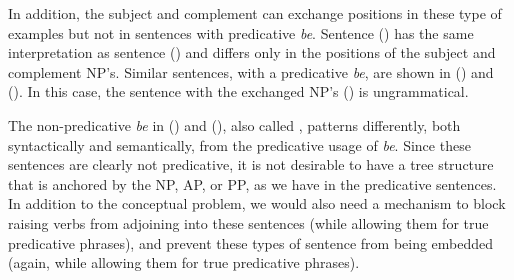


In addition, the subject and complement can exchange positions in these type of
examples but not in sentences with predicative {\it be}.  Sentence ({})
has the same interpretation as sentence ({}) and differs only in the
positions of the subject and complement NP's. Similar sentences, with a
predicative {\it be}, are shown in ({}) and ({}).  In this case,
the sentence with the exchanged NP's ({}) is ungrammatical.


The non-predicative {\it be} in ({}) and ({}), also called
, patterns differently, both syntactically and
semantically, from the predicative usage of {\it be}.  Since these sentences
are clearly not predicative, it is not desirable to have a tree structure that
is anchored by the NP, AP, or PP, as we have in the predicative sentences.  In
addition to the conceptual problem, we would also need a mechanism to block
raising verbs from adjoining into these sentences (while allowing them for true
predicative phrases), and prevent these types of sentence from being embedded
(again, while allowing them for true predicative phrases).  

